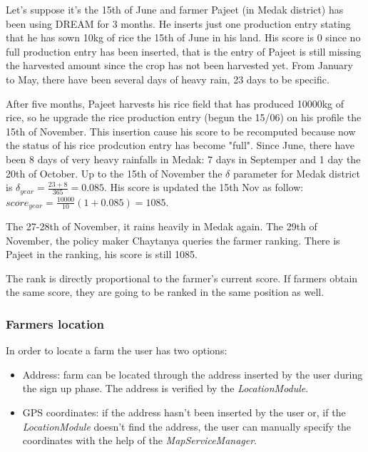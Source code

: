 \documentclass[table, 12pt]{article}
\newcounter{testexample}
\begin{document}
\begin{testexample}
Let's suppose it's the 15th of June and farmer Pajeet (in Medak district) has been using DREAM for 3 months. He inserts just one production entry stating that he has sown 10kg of rice the 15th of June in his land. His score is 0 since no full production entry has been inserted, that is the entry of Pajeet is still missing the harvested amount since the crop has not been harvested yet. From January to May, there have been several days of heavy rain, 23 days to be specific.

After five months, Pajeet harvests his rice field that has produced 10000kg of rice, so he upgrade the rice production entry (begun the 15/06) on his profile the 15th of November. This insertion cause his score to be recomputed because now the status of his rice prodcution entry has become "full". Since June, there have been 8 days of very heavy rainfalls in Medak: 7 days in Septemper and 1 day the 20th of October. Up to the 15th of November the $\delta$ parameter for Medak district is $\delta_{year}=\frac{23+8}{365}=0.085$. His score is updated the 15th Nov as follow: $score_{year}=\frac{10000}{10}(1+0.085)=1085$.

The 27-28th of November, it rains heavily in Medak again. The 29th of November, the policy maker Chaytanya queries the farmer ranking. There is Pajeet in the ranking, his score is still 1085.
\end{testexample}

 The rank is directly proportional to the farmer's current score. If farmers obtain the same score, they are going to be ranked in the same position as well.

\subsubsection{Farmers location} In order to locate a farm the user has two options:
    \begin{itemize}
        \item Address: farm can be located through the address inserted by the user during the sign up phase.
        The address is verified by the \textit{LocationModule}.
        \item GPS coordinates: if the address hasn't been inserted by the user or, if the \textit{LocationModule} doesn't find the address, the user can manually specify the coordinates with the help of the \textit{MapServiceManager}.
    \end{itemize}
\end{document}
